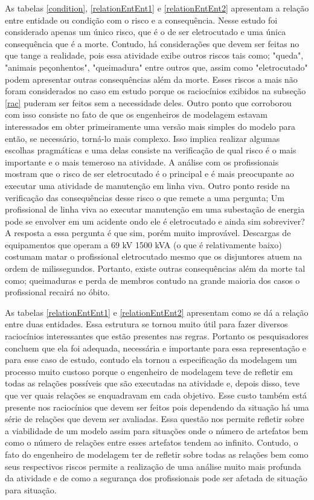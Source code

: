 As tabelas \ref{condition}, \ref{relationEntEnt1} e \ref{relationEntEnt2} apresentam a relação entre entidade ou condição com o risco e a consequência. Nesse estudo foi considerado apenas um único risco, que é o de ser eletrocutado e uma única consequência que é a morte. Contudo, há considerações que devem ser feitas no que tange a realidade, pois essa atividade exibe outros riscos tais como; "queda", "animais peçonhentos", "queimadura" entre outros que, assim como "eletrocutado" podem apresentar outras consequências além da morte. Esses riscos a mais não foram considerados no caso em estudo porque os raciocínios exibidos na subseção \ref{rac} puderam ser feitos sem a necessidade deles. Outro ponto que corroborou com isso consiste no fato de que os engenheiros de modelagem estavam interessados em obter primeiramente uma versão mais simples do modelo para então, se necessário, torná-lo mais complexo. Isso implica realizar algumas escolhas pragmáticas e uma delas consiste na verificação de qual risco é o mais importante e o mais temeroso na atividade. A análise com os profissionais mostram que o risco de 
ser eletrocutado é o principal e é mais preocupante ao executar uma atividade de manutenção em linha viva. Outro ponto reside na verificação das consequências desse risco o que remete a uma pergunta; Um profissional de linha viva ao executar manutenção em uma subestação de energia pode se envolver em um acidente ondo ele é eletrocutado e ainda sim sobreviver? A resposta a essa pergunta é que sim, porém muito improvável. Descargas de equipamentos que operam a 69 kV 1500 kVA  (o que é relativamente baixo) costumam matar o profissional eletrocutado mesmo que 
os disjuntores atuem na ordem de milissegundos. Portanto, existe outras consequências além da morte tal como; queimaduras e perda de membros contudo na grande maioria dos casos o profissional 
recairá no óbito. 

As tabelas \ref{relationEntEnt1} e \ref{relationEntEnt2} apresentam como se dá a relação entre duas entidades. Essa estrutura se tornou muito útil para fazer diversos raciocínios interessantes que estão presentes nas regras. Portanto os pesquisadores concluem que ela foi adequada, necessária e importante para essa representação e para esse caso de estudo, contudo ela tornou a especificação da modelagem um processo muito custoso porque o engenheiro de modelagem teve de refletir em todas as relações possíveis que são executadas na atividade e, depois disso, teve 
que ver quais relações se enquadravam em cada objetivo. Esse custo também está presente nos raciocínios que devem ser feitos pois dependendo da situação há uma série de relações que devem ser avaliadas. Essa questão nos permite refletir sobre a viabilidade de um modelo assim para situações onde o número de artefatos bem como o número de relações entre esses artefatos tendem ao infinito. Contudo, o fato do engenheiro de modelagem ter de refletir sobre todas as relações bem como seus respectivos riscos permite a realização de uma análise muito mais profunda 
da atividade e de como a segurança dos profissionais pode ser afetada de situação para situação. 

